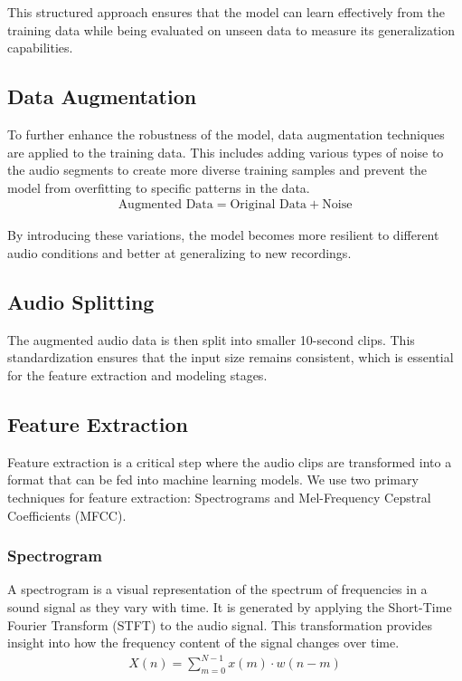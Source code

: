 This structured approach ensures that the model can learn effectively from the
training data while being evaluated on unseen data to measure its
generalization capabilities.

\subsection{Data Augmentation}

To further enhance the robustness of the model, data augmentation techniques
are applied to the training data. This includes adding various types of noise
to the audio segments to create more diverse training samples and prevent the
model from overfitting to specific patterns in the data.
\begin{eqnarray}
    \text{Augmented Data} = \text{Original Data} + \text{Noise}
\end{eqnarray}

By introducing these variations, the model becomes more resilient to different
audio conditions and better at generalizing to new recordings.

\subsection{Audio Splitting}

The augmented audio data is then split into smaller 10-second clips. This
standardization ensures that the input size remains consistent, which is
essential for the feature extraction and modeling stages.

\subsection{Feature Extraction}

Feature extraction is a critical step where the audio clips are transformed
into a format that can be fed into machine learning models. We use two primary
techniques for feature extraction: Spectrograms and Mel-Frequency Cepstral
Coefficients (MFCC).

\subsubsection{Spectrogram}

A spectrogram is a visual representation of the spectrum of frequencies in a
sound signal as they vary with time. It is generated by applying the Short-Time
Fourier Transform (STFT) to the audio signal. This transformation provides
insight into how the frequency content of the signal changes over time.
\begin{eqnarray}
    X(n) = \sum_{m=0}^{N-1} x(m) \cdot w(n-m)
\end{eqnarray}


